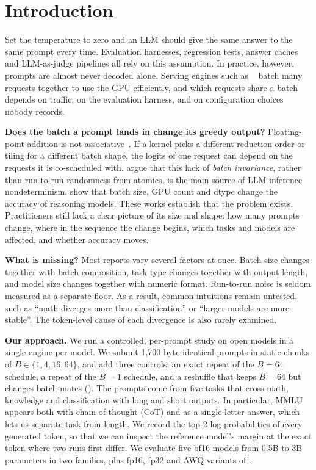 \section{Introduction}
\label{sec:intro}

Set the temperature to zero and an LLM should give the same answer to the same prompt every time. Evaluation harnesses, regression tests, answer caches and LLM-as-judge pipelines all rely on this assumption. In practice, however, prompts are almost never decoded alone. Serving engines such as \vllm~\citep{kwon2023vllm} batch many requests together to use the GPU efficiently, and which requests share a batch depends on traffic, on the evaluation harness, and on configuration choices nobody records.

{\bf Does the batch a prompt lands in change its greedy output?} Floating-point addition is not associative~\citep{goldberg1991floating}. If a kernel picks a different reduction order or tiling for a different batch shape, the logits of one request can depend on the requests it is co-scheduled with. \citet{he2025nondeterminism} argue that this lack of \emph{batch invariance}, rather than run-to-run randomness from atomics, is the main source of LLM inference nondeterminism. \citet{yuan2025fp32} show that batch size, GPU count and dtype change the accuracy of reasoning models. These works establish that the problem exists. Practitioners still lack a clear picture of its size and shape: how many prompts change, where in the sequence the change begins, which tasks and models are affected, and whether accuracy moves.

{\bf What is missing?} Most reports vary several factors at once. Batch size changes together with batch composition, task type changes together with output length, and model size changes together with numeric format. Run-to-run noise is seldom measured as a separate floor. As a result, common intuitions remain untested, such as ``math diverges more than classification'' or ``larger models are more stable''. The token-level cause of each divergence is also rarely examined.

{\bf Our approach.} We run a controlled, per-prompt study on open models in a single \vllm engine per model. We submit 1,700 byte-identical prompts in static chunks of $B\in\{1,4,16,64\}$, and add three controls: an exact repeat of the $B=64$ schedule, a repeat of the $B=1$ schedule, and a reshuffle that keeps $B=64$ but changes batch-mates (). The prompts come from five tasks that cross math, knowledge and classification with long and short outputs. In particular, MMLU appears both with chain-of-thought (CoT) and as a single-letter answer, which lets us separate task from length. We record the top-2 log-probabilities of every generated token, so that we can inspect the reference model's margin at the exact token where two runs first differ. We evaluate five bf16 models from 0.5B to 3B parameters in two families, plus fp16, fp32 and AWQ variants of \qwen.

